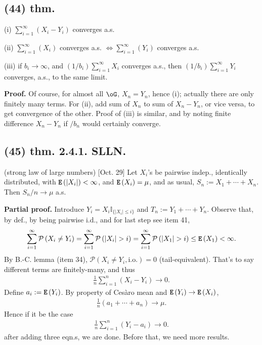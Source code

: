 \documentclass[12pt]{article}
\newcommand{\oo}\infty%
\newcommand{\F}\frac%
\newcommand{\Eq}{\Leftrightarrow}%
\newcommand{\Rb}[1]{ \left( #1 \right) }%
\newcommand{\BF}[1]{ \mathbb{#1} }%
\newcommand{\CF}[1]{ \mathcal{#1} }%
\newcommand{\Ss}[1]{\textsf{\bfseries{#1}}}%
\newcommand{\Tw}[1]{\texttt{\bfseries{#1}}}%
\newcommand{\EqGo}[1]{ \begin{gather*}{#1}\end{gather*} } %
\renewcommand{\P}[1]{ \CF P \Rb{#1} }%
\newcommand{\E}[1]{ \Tw{E}\Rb{#1} }%
\newcommand{\I}[1]{ \BF I_{\{#1\}} }%
\begin{document}
\subsection*{(44) thm.} (i)  \(\sum_{i=1}^\oo (X_i - Y_i)\) converges a.s. \par
(ii) \(\sum_{i=1}^\oo (X_i)\) converges a.s.
\(\Eq \sum_{i=1}^\oo (Y_i)\) converges a.s. \par
(iii) if \(b_i \to \oo\), and \((1/b_i) \sum_{i=1}^\oo X_i\) converges a.s., 
then \((1/b_i) \sum_{i=1}^\oo Y_i\) converges, a.s., to the same limit. \par 
\Ss{Proof.} Of course, for almost all \(\oG\), \(X_n = Y_n\), hence (i); actually there are only finitely many terms. 
For (ii), add sum of \(X_n\) to sum of \(X_n - Y_n\), or vice versa, to get convergence of the other. 
Proof of (iii) is similar, and by noting finite difference \(X_n - Y_n\) if \(/b_n\) would certainly converge. 

\subsection*{(45) thm. 2.4.1. SLLN.} (strong law of large numbers) [Oct. 29] Let \(X_i\)'s be pairwise indep., identically distributed, with \(\E{|X_i|} <\oo\), and \(\E{X_i} =\mu\), and as usual, \(S_n := X_1 +\dotsb+ X_n\). 
Then \(S_n /n \to \mu\) a.s. \par
\Ss{Partial proof.} Introduce \(Y_i = X_i \I{|X_i| \leq i}\) and \(T_n := Y_1 +\dotsb+ Y_n\). 
Observe that, by def., 
by being pairwise i.d., 
and for last step see item 41, \EqGo{
 \sum_{i=1}^\oo \P{X_i \neq Y_i}
 = \sum_{i=1}^\oo \P{ |X_i| > i }
 = \sum_{i=1}^\oo \P{ |X_1| > i }
 \leq \E{X_1}
 < \oo.
} By B.-C. lemma (item 34), \(\P{X_i \neq Y_i, \mathrm{i.o.}} =0\) (tail-equivalent). 
That's to say different terms are finitely-many, and thus \EqGo{
 \F{1}{n} \sum_{i=1}^n (X_i - Y_i) \to 0.
} Define \(a_i := \E{Y_i}\). By property of Ces\`aro mean and \(\E{Y_i} \to \E{X_i}\), \EqGo{
 \F{1}{n} (a_1 +\dotsb+ a_n) \to \mu.
} Hence if it be the case \EqGo{
 \F{1}{n} \sum_{i=1}^n (Y_i - a_i) \to 0.
} after adding three eqn.s, we are done. Before that, we need more results. 
\end{document}
